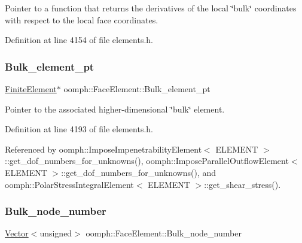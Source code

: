 Pointer to a function that returns the derivatives of the local \char`\"{}bulk\char`\"{} coordinates with respect to the local face coordinates. 



Definition at line 4154 of file elements.\+h.

\mbox{\label{classoomph_1_1FaceElement_a2d616b77ff557bbc70ece741fa2c6d96}} 
\subsubsection{\texorpdfstring{Bulk\+\_\+element\+\_\+pt}{Bulk\_element\_pt}}
{\footnotesize\ttfamily \hyperlink{classoomph_1_1FiniteElement}{Finite\+Element}$\ast$ oomph\+::\+Face\+Element\+::\+Bulk\+\_\+element\+\_\+pt\hspace{0.3cm}{\ttfamily [protected]}}



Pointer to the associated higher-\/dimensional \char`\"{}bulk\char`\"{} element. 



Definition at line 4193 of file elements.\+h.



Referenced by oomph\+::\+Impose\+Impenetrability\+Element$<$ E\+L\+E\+M\+E\+N\+T $>$\+::get\+\_\+dof\+\_\+numbers\+\_\+for\+\_\+unknowns(), oomph\+::\+Impose\+Parallel\+Outflow\+Element$<$ E\+L\+E\+M\+E\+N\+T $>$\+::get\+\_\+dof\+\_\+numbers\+\_\+for\+\_\+unknowns(), and oomph\+::\+Polar\+Stress\+Integral\+Element$<$ E\+L\+E\+M\+E\+N\+T $>$\+::get\+\_\+shear\+\_\+stress().

\mbox{\label{classoomph_1_1FaceElement_a27a8a3240049a53c7fac20ebde716846}} 
\subsubsection{\texorpdfstring{Bulk\+\_\+node\+\_\+number}{Bulk\_node\_number}}
{\footnotesize\ttfamily \hyperlink{classoomph_1_1Vector}{Vector}$<$unsigned$>$ oomph\+::\+Face\+Element\+::\+Bulk\+\_\+node\+\_\+number\hspace{0.3cm}{\ttfamily [protected]}}



